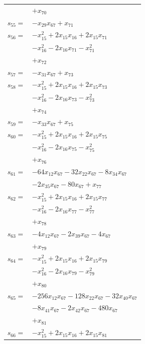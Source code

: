 \begin{longtable}{@{}r@{\;}l@{}}
 & \(\displaystyle +x_{70}\) \\[3pt]
\(s_{55}=\) & \(\displaystyle -x_{29}x_{67} +x_{71}\) \\[3pt]
\(s_{56}=\) & \(\displaystyle -x_{15}^{2} +2x_{15}x_{16} +2x_{15}x_{71}\) \\
 & \(\displaystyle -x_{16}^{2} -2x_{16}x_{71} -x_{71}^{2}\) \\
 & \(\displaystyle +x_{72}\) \\[3pt]
\(s_{57}=\) & \(\displaystyle -x_{31}x_{67} +x_{73}\) \\[3pt]
\(s_{58}=\) & \(\displaystyle -x_{15}^{2} +2x_{15}x_{16} +2x_{15}x_{73}\) \\
 & \(\displaystyle -x_{16}^{2} -2x_{16}x_{73} -x_{73}^{2}\) \\
 & \(\displaystyle +x_{74}\) \\[3pt]
\(s_{59}=\) & \(\displaystyle -x_{33}x_{67} +x_{75}\) \\[3pt]
\(s_{60}=\) & \(\displaystyle -x_{15}^{2} +2x_{15}x_{16} +2x_{15}x_{75}\) \\
 & \(\displaystyle -x_{16}^{2} -2x_{16}x_{75} -x_{75}^{2}\) \\
 & \(\displaystyle +x_{76}\) \\[3pt]
\(s_{61}=\) & \(\displaystyle -64x_{12}x_{67} -32x_{22}x_{67} -8x_{34}x_{67}\) \\
 & \(\displaystyle -2x_{35}x_{67} -80x_{67} +x_{77}\) \\[3pt]
\(s_{62}=\) & \(\displaystyle -x_{15}^{2} +2x_{15}x_{16} +2x_{15}x_{77}\) \\
 & \(\displaystyle -x_{16}^{2} -2x_{16}x_{77} -x_{77}^{2}\) \\
 & \(\displaystyle +x_{78}\) \\[3pt]
\(s_{63}=\) & \(\displaystyle -4x_{12}x_{67} -2x_{39}x_{67} -4x_{67}\) \\
 & \(\displaystyle +x_{79}\) \\[3pt]
\(s_{64}=\) & \(\displaystyle -x_{15}^{2} +2x_{15}x_{16} +2x_{15}x_{79}\) \\
 & \(\displaystyle -x_{16}^{2} -2x_{16}x_{79} -x_{79}^{2}\) \\
 & \(\displaystyle +x_{80}\) \\[3pt]
\(s_{65}=\) & \(\displaystyle -256x_{12}x_{67} -128x_{22}x_{67} -32x_{40}x_{67}\) \\
 & \(\displaystyle -8x_{41}x_{67} -2x_{42}x_{67} -480x_{67}\) \\
 & \(\displaystyle +x_{81}\) \\[3pt]
\(s_{66}=\) & \(\displaystyle -x_{15}^{2} +2x_{15}x_{16} +2x_{15}x_{81}\) \\

\end{longtable}
